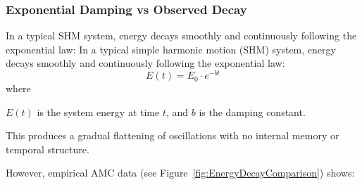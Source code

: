 \documentclass[10pt,aps,pre,onecolumn,superscriptaddress,notitlepage]{revtex4-2}
\begin{document}
\subsubsection{Exponential Damping vs Observed Decay
}
In a typical SHM system, energy decays smoothly and continuously following the exponential law:
In a typical simple harmonic motion (SHM) system, energy decays smoothly and continuously following the exponential law:
\begin{equation}
E(t) = E_0 \cdot e^{-bt}
\end{equation}
where 


\( E(t) \) is the system energy at time \( t \), and \( b \) is the damping constant.

This produces a gradual flattening of oscillations with no internal memory or temporal structure.

However, empirical AMC data (see Figure~\ref{fig:EnergyDecayComparison}) shows:
\end{document}
